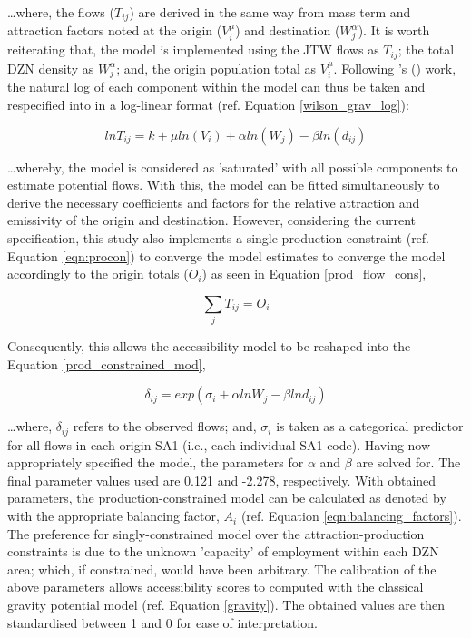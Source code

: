 \ldots where, the flows ($T_{ij}$) are derived in the same way from mass term and attraction factors noted at the origin ($V_{i}^{\mu}$) and destination ($W_{j}^{\alpha}$). It is worth reiterating that, the model is implemented using the JTW flows as $T_{ij}$; the total DZN density as $W_{j}^{\alpha}$; and, the origin population total as $V_{i}^{\mu}$. Following \citeauthor{dennett2012estimating}'s (\citeyear{dennett2012estimating}) work, the natural log of each component within the model can thus be taken and respecified into in a log-linear format (ref. Equation \ref{wilson_grav_log}):

\begin{equation}
    ln T_{ij} = k + \mu ln(V_{i}) + \alpha ln(W_{j}) - \beta ln(d_{ij})
    \label{wilson_grav_log}
\end{equation}

\ldots whereby, the model is considered as 'saturated' with all possible components to estimate potential flows. With this, the model can be fitted simultaneously to derive the necessary coefficients and factors for the relative attraction and emissivity of the origin and destination. However, considering the current specification, this study also implements a single production constraint (ref. Equation \ref{eqn:procon}) to converge the model estimates to converge the model accordingly to the origin totals ($O_{i}$) as seen in Equation \ref{prod_flow_cons},

\begin{equation}
    \sum_{j}T_{ij} = O_{i}
    \label{prod_flow_cons}
\end{equation}

Consequently, this allows the accessibility model to be reshaped into the Equation \ref{prod_constrained_mod},

\begin{equation}
    \delta_{ij} = exp(\sigma_{i} + \alpha ln W_{j} - \beta ln d_{ij})
    \label{prod_constrained_mod}
\end{equation}

\ldots where,  $\delta _{ij}$ refers to the observed flows; and, $\sigma_{i}$ is taken as a categorical predictor for all flows in each origin SA1 (i.e., each individual SA1 code). Having now appropriately specified the model, the parameters for $\alpha$ and $\beta$ are solved for. The final parameter values used are 0.121 and -2.278, respectively. With obtained parameters, the production-constrained model can be calculated as denoted by \cite{wilson1971family} with the appropriate balancing factor, $A_{i}$ (ref. Equation \ref{eqn:balancing_factors}). The preference for singly-constrained model over the attraction-production constraints is due to the unknown 'capacity' of employment within each DZN area; which, if constrained, would have been arbitrary. The calibration of the above parameters allows accessibility scores to computed with the classical gravity potential model (ref. Equation \ref{gravity}). The obtained values are then standardised between 1 and 0 for ease of interpretation. \\

